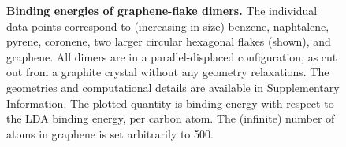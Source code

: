 \begin{figure}[t!]
\caption{\textbf{Binding energies of graphene-flake dimers.}
The individual data points correspond to (increasing in size) benzene, naphtalene, pyrene, coronene, two larger circular hexagonal flakes (shown), and graphene.
All dimers are in a parallel-displaced configuration, as cut out from a graphite crystal without any geometry relaxations.
The geometries and computational details are available in Supplementary Information.
The plotted quantity is binding energy with respect to the LDA binding energy, per carbon atom.
The (infinite) number of atoms in graphene is set arbitrarily to 500.
}\label{fig:flakes}
\end{figure}


